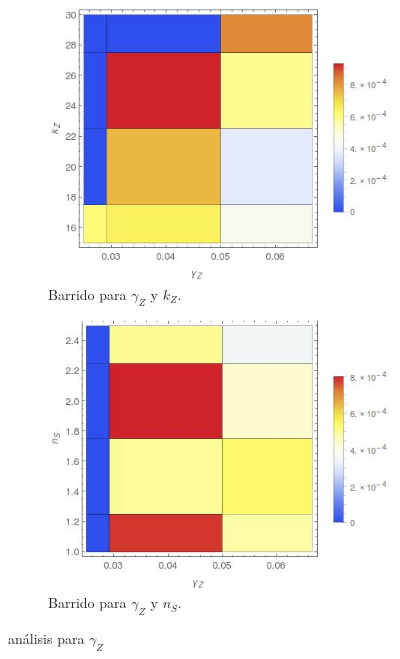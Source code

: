 \documentclass[12pt]{article}
\begin{document}
\begin{figure}[H]
  	\begin{subfigure}[b]{0.5\textwidth}
		\centering
		\includegraphics[width=\textwidth]{gammaZ-kZ.jpeg}
		\caption{\label{fig:gammaZ-kZ} Barrido para $\gamma_Z$ y $k_Z$.}
  	\end{subfigure} 	
  		\begin{subfigure}[b]{0.5\textwidth}
		\centering
		\includegraphics[width=\textwidth]{gammaZ-nS.jpeg}
		\caption{\label{fig:gammaZ-nS} Barrido para $\gamma_Z$ y $n_S$.}
  	\end{subfigure} 	
 \caption{\label{fig:gammaZ} an\'alisis para $\gamma _Z$}	
 \end{figure}
\end{document}

